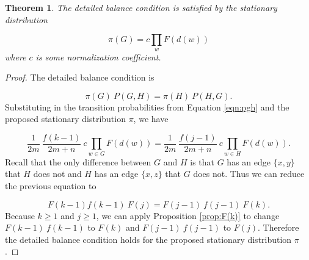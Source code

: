 \documentclass[a4paper,10pt]{article}
\newtheorem{theorem}{Theorem}
\begin{document}
\begin{theorem}
 The detailed balance condition is satisfied by the stationary distribution

\begin{equation}
 \pi(G) = c \prod_{w} F(d(w))
\end{equation}
where $c$ is some normalization coefficient.
\end{theorem}
\begin{proof}
The detailed balance condition is

\begin{equation}
 \pi(G) \: P(G, H) = \pi(H) \: P(H, G).
\end{equation}
Substituting in the transition probabilities from Equation \ref{eqn:pgh} and the proposed stationary distribution $\pi$, we have

\begin{equation}
\frac{1}{2m} \: \frac{f(k-1)}{2m+n}\:c\prod_{w \in G} F(d(w))  = \frac{1}{2m} \: \frac{f(j-1)}{2m+n}\:c\prod_{w \in H} F(d(w)).
\end{equation}
Recall that the only difference between $G$ and $H$ is that $G$ has an edge $\{x, y\}$ that $H$ does not and $H$ has an edge $\{x, z\}$ that $G$ does not. Thus we can reduce the previous equation to

\begin{equation}
F(k - 1) f(k - 1)\: F(j) = F(j - 1) \: f(j - 1) \: F(k).
\end{equation}
Because $k \geq 1$ and $j \geq 1$, we can apply Proposition \ref{prop:F(k)} to change $F(k - 1) \: f(k - 1)$ to $F(k)$ and $F(j - 1) \: f(j - 1)$ to $F(j)$. Therefore the detailed balance condition holds for the proposed stationary distribution $\pi$. 
\end{proof}
\end{document}
